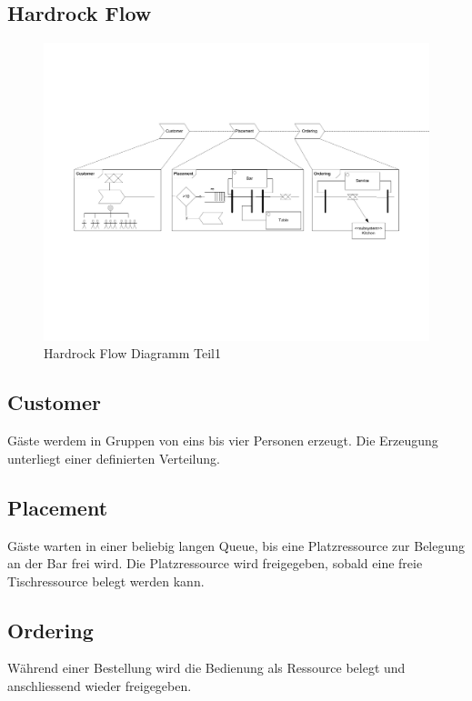 \documentclass[ngerman,a4paper,12pt]{scrreprt}
\begin{document}
\begin{landscape}
	\section{Hardrock Flow}
		\begin{figure}[H]
			\centering
				\includegraphics[page=1,trim=2cm 7cm 2cm 5cm, clip=true,width=1.4\textwidth]{../model/Modell_v2.pdf}
				\caption[Hardrock Flow Diagramm Teil1]{Hardrock Flow Diagramm Teil1}
				\label{flowDiagramm1}
		\end{figure}
		
		\subsection{Customer}
		Gäste werdem in Gruppen von eins bis vier Personen erzeugt. Die Erzeugung unterliegt einer definierten Verteilung.
		
		\subsection{Placement}
		Gäste warten in einer beliebig langen Queue, bis eine Platzressource zur Belegung an der Bar frei wird. Die Platzressource wird freigegeben, sobald eine freie Tischressource belegt werden kann.
		
		\subsection{Ordering}
		Während einer Bestellung wird die Bedienung als Ressource belegt und anschliessend wieder freigegeben.
		

\end{landscape}
\end{document}
